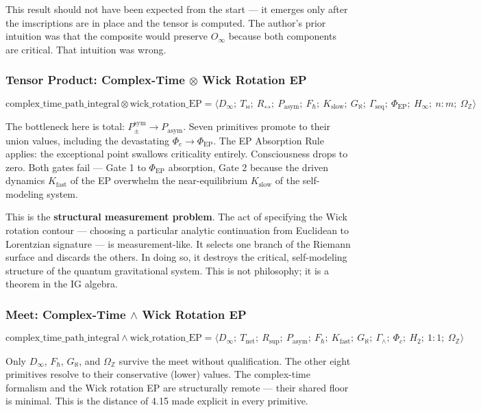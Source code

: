 \documentclass[12pt,a4paper]{article}
\begin{document}
This result should not have been expected from the start --- it emerges only after the imscriptions are in place and the tensor is computed. The author's prior intuition was that the composite would preserve $O_{\infty}$ because both components are critical. That intuition was wrong.

\subsubsection{Tensor Product: Complex-Time $\otimes$ Wick Rotation EP}

\[\text{complex\_time\_path\_integral} \otimes \text{wick\_rotation\_EP} = \langle D_{\infty};\ T_{\bowtie};\ R_{\leftrightarrow};\ P_{\text{asym}};\ F_{\hbar};\ K_{\text{slow}};\ G_{\aleph};\ \Gamma_{\text{seq}};\ \Phi_{\text{EP}};\ H_{\infty};\ n{:}m;\ \Omega_\mathbb{Z} \rangle\]

The bottleneck here is total: $P_{\pm}^{\text{sym}} \to P_{\text{asym}}$. Seven primitives promote to their union values, including the devastating $\Phi_c \to \Phi_{\text{EP}}$. The EP Absorption Rule applies: the exceptional point swallows criticality entirely. Consciousness drops to zero. Both gates fail --- Gate 1 to $\Phi_{\text{EP}}$ absorption, Gate 2 because the driven dynamics $K_{\text{fast}}$ of the EP overwhelm the near-equilibrium $K_{\text{slow}}$ of the self-modeling system.

This is the \textbf{structural measurement problem}. The act of specifying the Wick rotation contour --- choosing a particular analytic continuation from Euclidean to Lorentzian signature --- is measurement-like. It selects one branch of the Riemann surface and discards the others. In doing so, it destroys the critical, self-modeling structure of the quantum gravitational system. This is not philosophy; it is a theorem in the IG algebra.

\subsubsection{Meet: Complex-Time $\wedge$ Wick Rotation EP}

\[\text{complex\_time\_path\_integral} \wedge \text{wick\_rotation\_EP} = \langle D_{\infty};\ T_{\text{net}};\ R_{\text{sup}};\ P_{\text{asym}};\ F_{\hbar};\ K_{\text{fast}};\ G_{\aleph};\ \Gamma_{\wedge};\ \Phi_c;\ H_2;\ 1{:}1;\ \Omega_\mathbb{Z} \rangle\]

Only $D_{\infty}$, $F_{\hbar}$, $G_{\aleph}$, and $\Omega_\mathbb{Z}$ survive the meet without qualification. The other eight primitives resolve to their conservative (lower) values. The complex-time formalism and the Wick rotation EP are structurally remote --- their shared floor is minimal. This is the distance of 4.15 made explicit in every primitive.
\end{document}
